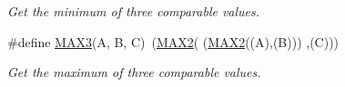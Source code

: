 \begin{DoxyCompactItemize}
\begin{DoxyCompactList}\small\item\em Get the minimum of three comparable values. \end{DoxyCompactList}\item 
\hypertarget{group__utils_ga8d577123d2e66d2b7d0bf9af6e172b93}{\#define \hyperlink{group__utils_ga8d577123d2e66d2b7d0bf9af6e172b93}{M\-A\-X3}(A, B, C)~(\hyperlink{group__utils_ga33297b3679c713b0c4d897cd0fe3b122}{M\-A\-X2}(  (\hyperlink{group__utils_ga33297b3679c713b0c4d897cd0fe3b122}{M\-A\-X2}((A),(B))) ,(C)))}\label{group__utils_ga8d577123d2e66d2b7d0bf9af6e172b93}

\begin{DoxyCompactList}\small\item\em Get the maximum of three comparable values. \end{DoxyCompactList}\end{DoxyCompactItemize}
